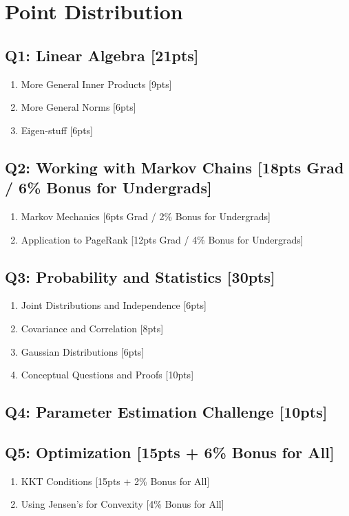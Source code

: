 \section*{Point Distribution}
\subsection*{Q1: Linear Algebra [21pts]}
\begin{enumerate}[label=\arabic*.]
    \itemsep0em
    \item More General Inner Products [9pts]
    \item More General Norms [6pts]
    \item Eigen-stuff [6pts]
\end{enumerate}

\subsection*{Q2: Working with Markov Chains [18pts Grad / 6\% Bonus for Undergrads]}
\begin{enumerate}[label=\arabic*.]
    \itemsep0em
    \item Markov Mechanics [6pts Grad / 2\% Bonus for Undergrads]
    \item Application to PageRank [12pts Grad / 4\% Bonus for Undergrads]
\end{enumerate}

\subsection*{Q3: Probability and Statistics [30pts]}
\begin{enumerate}[label=\arabic*.]
    \itemsep0em
    \item Joint Distributions and Independence [6pts]
    \item Covariance and Correlation [8pts]
    \item Gaussian Distributions [6pts]
    \item Conceptual Questions and Proofs [10pts]
\end{enumerate}

\subsection*{Q4: Parameter Estimation Challenge [10pts]}

\subsection*{Q5: Optimization [15pts + 6\% Bonus for All]}
\begin{enumerate}[label=\arabic*.]
    \itemsep0em
    \item KKT Conditions [15pts + 2\% Bonus for All]
    \item Using Jensen's for Convexity [4\% Bonus for All]
\end{enumerate}

